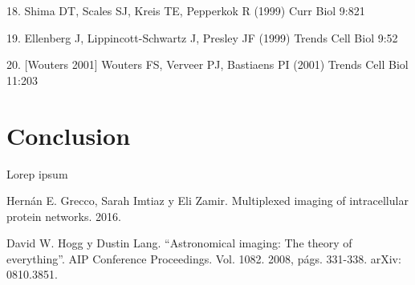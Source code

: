 \documentclass{ctuthesis}
\begin{document}
18. Shima DT, Scales SJ, Kreis TE, Pepperkok R (1999) Curr Biol 9:821 

19. Ellenberg J, Lippincott-Schwartz J, Presley JF (1999) Trends Cell Biol 9:52

20. [Wouters 2001] Wouters FS, Verveer PJ, Bastiaens PI (2001) Trends Cell Biol 11:203
\chapter{Conclusion}

Lorep ipsum \cite{doe}

\begin{thebibliography}{1}

 Hernán E. Grecco, Sarah Imtiaz y Eli Zamir. Multiplexed
imaging of intracellular protein networks. 2016.

 David W. Hogg y Dustin Lang. “Astronomical imaging: The
	theory of everything”. AIP Conference Proceedings. Vol. 1082.
	2008, págs. 331-338. arXiv: 0810.3851.

\end{thebibliography}
\end{document}
